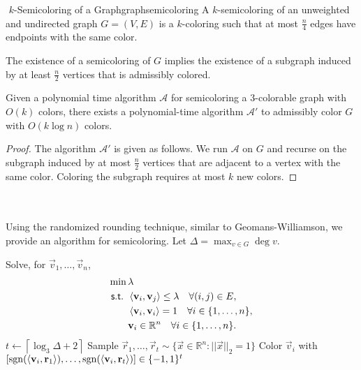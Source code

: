         \begin{definition}{\Stop\,\,\(k\)-Semicoloring of a Graph}{graphsemicoloring}
            A \(k\)-semicoloring of an unweighted and undirected graph \(G=(V,E)\) is a \(k\)-coloring such that at most \(\frac{n}{4}\) edges have endpoints with the same color.
        \end{definition}
        \begin{remark*}
            The existence of a semicoloring of \(G\) implies the existence of a subgraph induced by at least \(\frac{n}{2}\) vertices that is admissibly colored.
        \end{remark*}
        \begin{lemma*}
            Given a polynomial time algorithm \(\mathcal{A}\) for semicoloring a \(3\)-colorable graph with \(O(k)\) colors, there exists a polynomial-time algorithm \(\mathcal{A}'\) to admissibly color \(G\) with \(O(k\log n)\) colors.
            \begin{proof}
                The algorithm \(\mathcal{A}'\) is given as follows. We run \(\mathcal{A}\) on \(G\) and recurse on the subgraph induced by at most \(\frac{n}{2}\) vertices that are adjacent to a vertex with the same color. Coloring the subgraph requires at most \(k\) new colors.
            \end{proof}
        \end{lemma*}
        \vphantom
        \\
        \\
        Using the randomized rounding technique, similar to Geomans-Williamson, we provide an algorithm for semicoloring. Let \(\Delta=\max_{v\in G}\deg v\).
        \begin{algorithm}[H] 
            \begin{algorithmic}[1]
                    \State Solve, for \(\vec{v}_1,\ldots,\vec{v}_n\),
                    \begin{align*}
                        \min\,&\lambda \\
                        \textsf{s.t. }&\left\langle \mathbf{v}_i,\mathbf{v}_j\right\rangle\leq\lambda\quad \forall (i,j)\in E, \\
                        &\left\langle \mathbf{v}_i,\mathbf{v}_i\right\rangle=1 \quad \forall i\in\{1,\ldots,n\}, \\
                        &\mathbf{v}_i\in\mathbb{R}^n \quad \forall i\in\{1,\ldots,n\}.
                    \end{align*}
                    \State \(t\gets \left\lceil \log_3\Delta+2\right\rceil\)
                    \State Sample \(\vec{r}_1,\ldots,\vec{r}_t\sim\{\vec{x}\in\mathbb{R}^n:||\vec{x}||_2=1\}\)
                        \State Color \(\vec{v}_i\) with \([\operatorname{sgn}(\left\langle \mathbf{v}_i,\mathbf{r}_1\right\rangle),\ldots,\operatorname{sgn}(\left\langle \mathbf{v}_i,\mathbf{r}_t\right\rangle)]\in\{-1,1\}^t\) 
                    \EndFor
                \EndProcedure 
            \end{algorithmic}
            \caption{Graph Semicoloring}
            \label{alg:graph-semicoloring}
        \end{algorithm}
